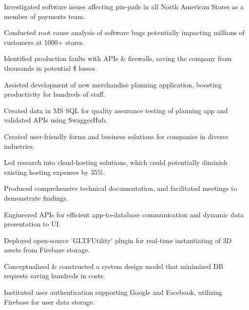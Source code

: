\documentclass[]{deedy-resume-openfont}
\begin{document}
\hspace{1cm}
\begin{tightemize}
\item Investigated software issues affecting pin-pads in all North American Stores as a member of payments team.
\item Conducted root cause analysis of software bugs potentially impacting millions of customers at 1000+ stores.
\item Identified production faults with APIs \& firewalls, saving the company from thousands in potential \$ losses.
\item Assisted development of new merchandise planning application, boosting productivity for hundreds of staff.
\item Created data in MS SQL for quality assurance testing of planning app and validated APIs using SwaggerHub.
\end{tightemize}
\sectionsep

\hspace{1cm}
\begin{tightemize}
\item Created user-friendly forms and business solutions for companies in diverse industries.
\item Led research into cloud-hosting solutions, which could potentially diminish existing hosting expenses by 35\%.
\item Produced comprehensive technical documentation, and facilitated meetings to demonstrate findings.
\end{tightemize}




\descript{}
\hspace{1cm}
\begin{tightemize}
\item Engineered APIs for efficient app-to-database communication and dynamic data presentation to UI.
\item Deployed open-source 'GLTFUtility' plugin for real-time instantiating of 3D assets from Firebase storage.
\item Conceptualized \& constructed a system design model that minimized DB requests saving hundreds in costs.
\item Instituted user authentication supporting Google and Facebook, utilizing Firebase for user data storage.
\end{tightemize}
\sectionsep
\end{document}
